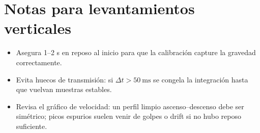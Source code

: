 \documentclass[11pt,a4paper]{article}
\begin{document}
\section*{Notas para levantamientos verticales}
\begin{itemize}[leftmargin=12pt]
  \item Asegura 1--2 s en reposo al inicio para que la calibración capture la gravedad correctamente.
  \item Evita huecos de transmisión: si \(\Delta t > 50\ \text{ms}\) se congela la integración hasta que vuelvan muestras estables.
  \item Revisa el gráfico de velocidad: un perfil limpio ascenso--descenso debe ser simétrico; picos espurios suelen venir de golpes o drift si no hubo reposo suficiente.
\end{itemize}
\end{document}
